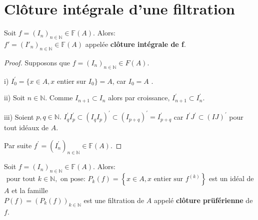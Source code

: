\section{Clôture intégrale d'une filtration}
\begin{maproposition}
	Soit $f=(I_n)_{n\in \mathbb{N}} \in \mathbb{F}(A).$ Alors:\\
	$f'=(I'_n)_{n\in \mathbb{N}} \in \mathbb{F}(A)$ appelée \textbf{clôture intégrale de f}.
\end{maproposition}
\begin{proof}
	Supposons que $f=(I_{n})_{n\in \mathbb{N}}\in F(A).$
	
	i) $I_{0}^{\prime }=\{x\in A,x$ entier sur $I_{0}\}=A$, car $I_{0}=A$ $.$
	
	ii) Soit $n\in \mathbb{N}.$
	Comme $I_{n+1}\subset I_{n}$ alors par croissance, $I_{n+1}^{\prime }\subset I_{n}^{\prime }.$
	
	iii) Soient $p,q\in \mathbb{N}.$
	$I_{q}^{\prime }I_{p}^{\prime }\subset (I_{q}I_{p})^{\prime }\subset (I_{p+q})^{\prime }=I_{p+q}^{\prime }$ car $I^{\prime }J^{\prime }\subset (IJ)^{\prime }$ pour tout idéaux de $A.$
	
	Par suite $f^{\prime }=(I_{n}^{\prime })_{n\in \mathbb{N}}\in \mathbb{F}(A).$
\end{proof}
\begin{moncorollaire}
	Soit $f=(I_n)_{n \in \mathbb{N}} \in \mathbb{F}(A)$. Alors:\\
	$\text{ pour tout } k \in \mathbb{N}, \text{ on pose: } P_k(f)=\left\{x \in A, x \text{ entier sur } f^{(k)}\right\}$ est un idéal de $A$ et la famille \\ $P(f)=(P_k(f))_{k \in \mathbb{N}}$ est une filtration de $A$ appelé \textbf{clôture prüférienne} de $f$.
\end{moncorollaire}
